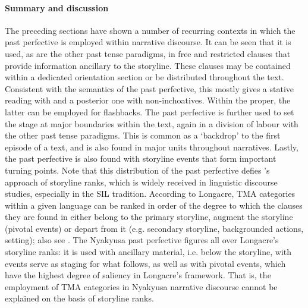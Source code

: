 \paragraph{Summary and discussion}\label{PastPFVNarrativeDiscourseSummary}
The preceding sections have shown a number of recurring contexts in which the past perfective is employed within narrative discourse. It can be seen that it is used, as are the other past tense paradigms, in free and restricted clauses that provide information ancillary to the storyline. These clauses may be contained within a dedicated orientation section or be distributed throughout the text. Consistent with the semantics of the past perfective, this mostly gives a stative reading with  and a posterior one with non-inchoatives. Within the  proper, the latter can be employed for flashbacks. The past perfective is further used to set the stage at major boundaries within the text, again in a division of labour with the other past tense paradigms. This is common as a \lq backdrop' to the first episode of a text, and is also found in major units throughout narratives. Lastly, the past perfective is also found with storyline events that form important turning points.
Note that this distribution of the past perfective defies \citeauthor{LongacreR1990}'s approach of storyline ranks, which is widely received in linguistic discourse studies, especially in the SIL tradition. According to Longacre, TMA categories within a given language can be ranked  in order of the degree to which the clauses they are found in either belong to the primary storyline, augment the storyline (pivotal events) or depart from it (e.g. secondary storyline, backgrounded actions, setting); also see . The Nyakyusa past perfective figures all over Longacre's storyline ranks: it is used with ancillary material, i.e. below the storyline, with events serve as staging for what follows, as well as with pivotal events, which have the highest degree of saliency in Longacre's framework. That is, the employment of TMA categories in Nyakyusa narrative discourse cannot be explained on the basis of storyline ranks.

